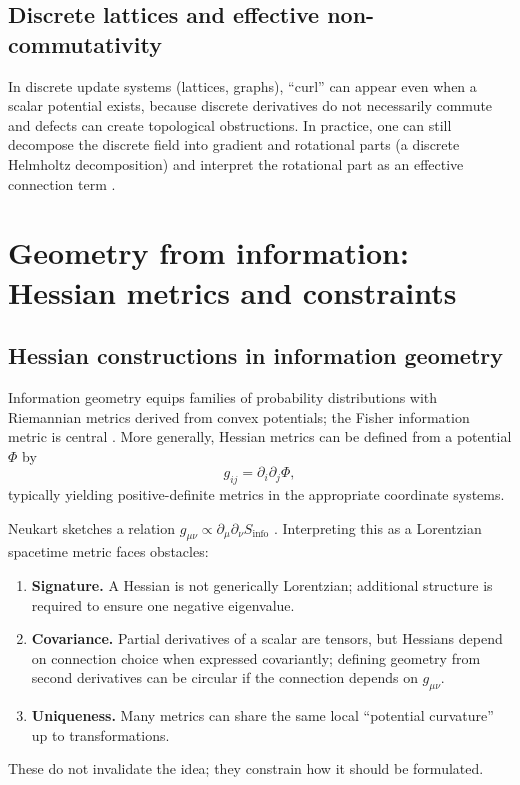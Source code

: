\documentclass[11pt]{article}
\newcommand{\Sinfo}{S_{\mathrm{info}}}
\begin{document}
    \subsection{Discrete lattices and effective non-commutativity}
        In discrete update systems (lattices, graphs), ``curl'' can appear even when a scalar potential exists, because discrete derivatives do not necessarily commute and defects can create topological obstructions. In practice, one can still decompose the discrete field into gradient and rotational parts (a discrete Helmholtz decomposition) and interpret the rotational part as an effective connection term \cite{LeVeque2002_FVM,Press2007_NR}.

    \section{Geometry from information: Hessian metrics and constraints}
    \subsection{Hessian constructions in information geometry}
        Information geometry equips families of probability distributions with Riemannian metrics derived from convex potentials; the Fisher information metric is central \cite{Amari2016_InfoGeometry,CoverThomas2006_InfoTheory}. More generally, Hessian metrics can be defined from a potential $\Phi$ by
        \begin{equation}
            g_{ij} = \partial_i\partial_j \Phi,
            \label{eq:hessian_metric}
        \end{equation}
        typically yielding positive-definite metrics in the appropriate coordinate systems.

        Neukart sketches a relation $g_{\mu\nu}\propto \partial_\mu\partial_\nu \Sinfo$ \cite{Neukart2026_InfoTime}. Interpreting this as a Lorentzian spacetime metric faces obstacles:
        \begin{enumerate}[label=(\alph*)]
\item \textbf{Signature.} A Hessian is not generically Lorentzian; additional structure is required to ensure one negative eigenvalue.
\item \textbf{Covariance.} Partial derivatives of a scalar are tensors, but Hessians depend on connection choice when expressed covariantly; defining geometry from second derivatives can be circular if the connection depends on $g_{\mu\nu}$.
\item \textbf{Uniqueness.} Many metrics can share the same local ``potential curvature'' up to transformations.
        \end{enumerate}
        These do not invalidate the idea; they constrain how it should be formulated.
\end{document}
